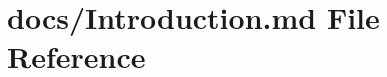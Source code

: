\hypertarget{Introduction_8md}{\section{docs/\+Introduction.md File Reference}
\label{Introduction_8md}
}
